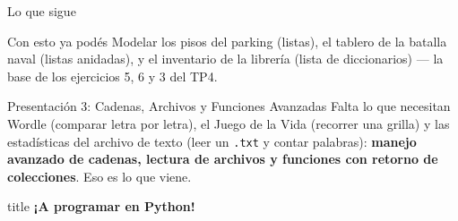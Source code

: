 \documentclass{beamer}
\begin{document}
\begin{frame}{Lo que sigue}
  \begin{block}{Con esto ya podés}
    Modelar los pisos del parking (listas), el tablero de la batalla naval
    (listas anidadas), y el inventario de la librería (lista de
    diccionarios) — la base de los ejercicios 5, 6 y 3 del TP4.
  \end{block}
  \begin{alertblock}{Presentación 3: Cadenas, Archivos y Funciones Avanzadas}
    Falta lo que necesitan Wordle (comparar letra por letra), el Juego de
    la Vida (recorrer una grilla) y las estadísticas del archivo de texto
    (leer un \texttt{.txt} y contar palabras): \textbf{manejo avanzado de
    cadenas, lectura de archivos y funciones con retorno de colecciones}.
    Eso es lo que viene.
  \end{alertblock}
\end{frame}

\begin{frame}
  \vfill
  \centering
  \begin{beamercolorbox}[sep=8pt,center,shadow=true,rounded=true]{title}
    \Huge \bfseries ¡A programar en Python!
  \end{beamercolorbox}
  \vfill
\end{frame}
\end{document}
